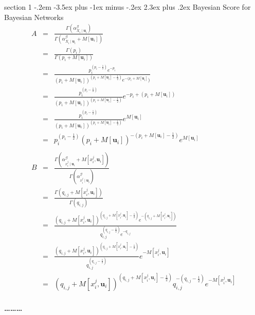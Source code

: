 \documentclass[12pt]{article}
\makeatletter
\newenvironment{problem}{\@startsection
       {section}
       {1}
       {-.2em}
       {-3.5ex plus -1ex minus -.2ex}
       {2.3ex plus .2ex}
       {\pagebreak[3]%
       \large\bf\noindent{Problem }
       }
       }
       {%
       \begin{center}\large\bf \ldots\ldots\ldots\end{center}}
\makeatother
\begin{document}
\begin{problem}{Bayesian Score for Bayesian Networks}
\begin{eqnarray*}
A & = & \frac{\Gamma(\alpha^{\mathcal{G}}_{X_{i}\mid \mathbf{u}_{i}})}{\Gamma(\alpha^{\mathcal{G}}_{X_{i}\mid \mathbf{u}_{i}} + M[ \mathbf{u}_{i}])} \\
& = & \frac{\Gamma(p_{i})}{\Gamma(p_{i} + M[ \mathbf{u}_{i}])} \\
& = & \frac{p_{i}^{(p_{i}-\frac{1}{2})} e^{-p_{i}}}{(p_{i} + M[ \mathbf{u}_{i}])^{(p_{i} + M[ \mathbf{u}_{i}] - \frac{1}{2})}e^{-(p_{i} + M[ \mathbf{u}_{i}]})} \\
& = & \frac{p_{i}^{(p_{i}-\frac{1}{2})} }{(p_{i} + M[ \mathbf{u}_{i}])^{(p_{i} + M[ \mathbf{u}_{i}] - \frac{1}{2})}} e^{-p_{i}+(p_{i} + M[ \mathbf{u}_{i}])} \\
& = & \frac{p_{i}^{(p_{i}-\frac{1}{2})} }{(p_{i} + M[ \mathbf{u}_{i}])^{(p_{i} + M[ \mathbf{u}_{i}] - \frac{1}{2})}} e^{ M[ \mathbf{u}_{i}]} \\
& = & p_{i}^{(p_{i}-\frac{1}{2})} 
	(p_{i} + M[ \mathbf{u}_{i}])^{-(p_{i} + M[ \mathbf{u}_{i}] - \frac{1}{2})} 
	e^{ M[ \mathbf{u}_{i}]} \\
\\
B & = & \frac{\Gamma(\alpha^{\mathcal{G}}_{x_{i}^{j}\mid \mathbf{u}_{i}} + M[ x_{i}^{j},\mathbf{u}_{i}])}{\Gamma(\alpha^{\mathcal{G}}_{x_{i}^{j}\mid \mathbf{u}_{i}} )}\\
& = & \frac{\Gamma(q_{i,j}  + M[ x_{i}^{j},\mathbf{u}_{i}])}{\Gamma(q_{i,j} )}\\
& = & \frac{(q_{i,j}  + M[ x_{i}^{j},\mathbf{u}_{i}])^{(q_{i,j}  + M[ x_{i}^{j},\mathbf{u}_{i}] -\frac{1}{2})}e^{-(q_{i,j}  + M[ x_{i}^{j},\mathbf{u}_{i}])}}{q_{i,j} ^{(q_{i,j} -\frac{1}{2})} e^{-q_{i,j} }}\\
& = & \frac{(q_{i,j}  + M[ x_{i}^{j},\mathbf{u}_{i}])^{(q_{i,j}  + M[ x_{i}^{j},\mathbf{u}_{i}] -\frac{1}{2})}}{q_{i,j} ^{(q_{i,j} -\frac{1}{2})} } 
	e^{-M[ x_{i}^{j},\mathbf{u}_{i}]}\\
& = & (q_{i,j}  + M[ x_{i}^{j},\mathbf{u}_{i}])^{(q_{i,j}  + M[ x_{i}^{j},\mathbf{u}_{i}] -\frac{1}{2})}
	q_{i,j} ^{-(q_{i,j} -\frac{1}{2})} 
	e^{-M[ x_{i}^{j},\mathbf{u}_{i}]}\\
\end{eqnarray*}



\end{problem}
\end{document}
